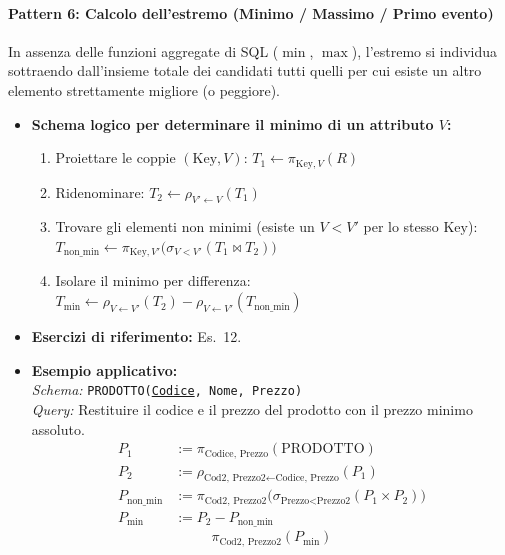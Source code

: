 \documentclass[12pt]{extarticle}
\begin{document}
\paragraph{Pattern 6: Calcolo dell'estremo (Minimo / Massimo / Primo evento)}
In assenza delle funzioni aggregate di SQL ($\min$, $\max$), l'estremo si individua sottraendo dall'insieme totale dei candidati tutti quelli per cui esiste un altro elemento strettamente migliore (o peggiore).
\begin{itemize}
    \item \textbf{Schema logico per determinare il minimo di un attributo $V$:}
    \begin{enumerate}
        \item Proiettare le coppie $(\text{Key}, V)$: $T_1 \leftarrow \pi_{\text{Key}, V}(R)$
        \item Ridenominare: $T_2 \leftarrow \rho_{V' \leftarrow V}(T_1)$
        \item Trovare gli elementi non minimi (esiste un $V < V'$ per lo stesso $\text{Key}$):\\
        $T_{\text{non\_min}} \leftarrow \pi_{\text{Key}, V'}\big( \sigma_{V < V'}(T_1 \bowtie T_2) \big)$
        \item Isolare il minimo per differenza:\\
        $T_{\text{min}} \leftarrow \rho_{V \leftarrow V'}(T_2) - \rho_{V \leftarrow V'}(T_{\text{non\_min}})$
    \end{enumerate}
    \item \textbf{Esercizi di riferimento:} Es.~12.
    \item \textbf{Esempio applicativo:}\\
    \textit{Schema:} \texttt{PRODOTTO(\underline{Codice}, Nome, Prezzo)}\\
    \textit{Query:} Restituire il codice e il prezzo del prodotto con il prezzo minimo assoluto.
    \[
    \begin{aligned}
    P_1 &:= \pi_{\text{Codice, Prezzo}}(\text{PRODOTTO}) \\[0.3em]
    P_2 &:= \rho_{\text{Cod2, Prezzo2} \leftarrow \text{Codice, Prezzo}}(P_1) \\[0.3em]
    P_{\text{non\_min}} &:= \pi_{\text{Cod2, Prezzo2}} \big( \sigma_{\text{Prezzo} < \text{Prezzo2}}(P_1 \times P_2) \big) \\[0.3em]
    P_{\text{min}} &:= P_2 - P_{\text{non\_min}}
    \end{aligned}
    \]
    \[
    \pi_{\text{Cod2, Prezzo2}}(P_{\text{min}})
    \]
\end{itemize}
\end{document}
